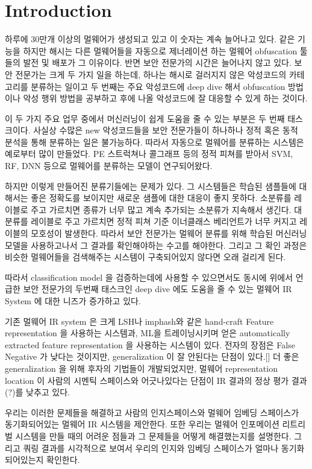 \section{Introduction}
하루에 30만개 이상의 멀웨어가 생성되고 있고 이 숫자는 계속 늘어나고 있다. 같은 기능을 하지만 해시는 다른 멀웨어들을 자동으로 제너레이션 하는 멀웨어 obfuscation 툴들의 발전 및 배포가 그 이유이다. 반면 보안 전문가의 시간은 늘어나지 않고 있다. 보안 전문가는 크게 두 가지 일을 하는데, 하나는 해시로 걸러지지 않은 악성코드의 카테고리를 분류하는 일이고 두 번째는  주요 악성코드에 deep dive 해서 obfuscation 방법이나 악성 행위 방법을 공부하고 후에 나올 악성코드에 잘 대응할 수 있게 하는 것이다.   

이 두 가지 주요 업무 중에서 머신러닝이 쉽게 도움을 줄 수 있는 부분은 두 번째 태스크이다. 사실상 수많은 new 악성코드들을 보안 전문가들이 하나하나 정적 혹은 동적 분석을 통해 분류하는 일은 불가능하다. 따라서 자동으로 멀웨어를 분류하는 시스템은 예로부터 많이 만들었다. PE 스트럭쳐나 콜그래프 등의 정적 피쳐를 받아서 SVM, RF, DNN 등으로 멀웨어를 분류하는 모델이 연구되어왔다.   

하지만 이렇게 만들어진 분류기들에는 문제가 있다. 그 시스템들은 학습된 샘플들에 대해서는 좋은 정확도를 보이지만 새로운 샘플에 대한 대응이 좋지 못하다. 소분류를 레이블로 주고 가르치면 종류가 너무 많고 계속 추가되는 소분류가 지속해서 생긴다. 대분류를 레이블로 주고 가르치면 정적 피쳐 기준 이너클래스 베리언트가 너무 커지고 레이블의 모호성이 발생한다. 따라서 보안 전문가는 멀웨어 분류를 위해 학습된 머신러닝 모델을 사용하고나서 그 결과를 확인해야하는 수고를 해야한다. 그리고 그 확인 과정은 비슷한 멀웨어들을 검색해주는 시스템이 구축되어있지 않다면 오래 걸리게 된다.  

따라서 classification model 을 검증하는데에 사용할 수 있으면서도 동시에 위에서 언급한 보안 전문가의 두번째 태스크인 deep dive 에도 도움을 줄 수 있는 멀웨어 IR System 에 대한 니즈가 증가하고 있다.  
 
기존 멀웨어 IR system 은 크게 LSH나 imphash와 같은 hand-craft Feature representation 을 사용하는 시스템과, ML을 트레이닝시키며 얻은 automatically extracted feature representation 을 사용하는 시스템이 있다. 전자의 장점은 False Negative 가 낮다는 것이지만, generalization 이 잘 안된다는 단점이 있다.[] 더 좋은 generalization 을 위해 후자의 기법들이 개발되었지만, 멀웨어 representation location 이 사람의 시멘틱 스페이스와 어긋나있다는 단점이 IR 결과의 정상 평가 결과(?)를 낮추고 있다.   

우리는 이러한 문제들을 해결하고 사람의 인지스페이스와 멀웨어 임베딩 스페이스가 동기화되어있는 멀웨어 IR 시스템을 제안한다. 또한 우리는 멀웨어 인포메이션 리트리벌 시스템을 만들 때의 어려운 점들과 그 문제들을 어떻게 해결했는지를 설명한다. 그리고 쿼링 결과를 시각적으로 보여서 우리의 인지와 임베딩 스페이스가 얼마나 동기화되어있는지 확인한다.  


